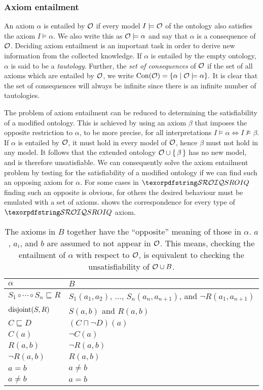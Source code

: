 \subsubsection{Axiom entailment} \label{axiom-entailment}

An axiom $\alpha$ is entailed by $\mathcal{O}$ if every model $I \models \mathcal{O}$ of the ontology also satisfies the axiom $I \models \alpha$. We also write this as $\mathcal{O} \models \alpha$ and say that $\alpha$ is a consequence of $\mathcal{O}$. Deciding axiom entailment is an important task in order to derive new information from the collected knowledge. If $\alpha$ is entailed by the empty ontology, $\alpha$ is said to be a \emph{tautology}. Further, the \emph{set of consequences} of $\mathcal{O}$ if the set of all axioms which are entailed by $\mathcal{O}$, we write $\operatorname{Con}(\mathcal{O}) = \{ \alpha \mid \mathcal{O} \models \alpha \}.$ It is clear that the set of consequences will always be infinite since there is an infinite number of tautologies.

The problem of axiom entailment can be reduced to determining the satisfiability of a modified ontology. This is achieved by using an axiom $\beta$ that imposes the opposite restriction to $\alpha$, to be more precise, for all interpretations $I \models \alpha \iff I \not\models \beta$. If $\alpha$ is entailed by $\mathcal{O}$, it must hold in every model of $\mathcal{O}$, hence $\beta$ must not hold in any model. It follows that the extended ontology $\mathcal{O} \cup \{ \, \beta \, \}$ has no new model, and is therefore unsatisfiable. We can consequently solve the axiom entailment problem by testing for the satisfiability of a modified ontology if we can find such an opposing axiom for $\alpha$. For some cases in $\SROIQ$ finding such an opposite is obvious, for others the desired behaviour must be emulated with a set of axioms.  shows the correspondence for every type of $\SROIQ$ axiom.
\begin{table}[ht]
  \centering
  \begin{tabular}{|l|l|}
    \hline
    $\alpha$ & $B$ \\
    \hline
    $S_1 \circ \cdots \circ S_n \sqsubseteq R$ & $S_1(a_1, a_2)$, $\dots$, $S_n(a_n, a_{n + 1})$, and $\lnot R(a_1, a_{n + 1})$ \\
    $\operatorname{disjoint}(S, R)$ & $S(a, b)$ and $R(a, b)$ \\
    $C \sqsubseteq D$ & $(C \sqcap \lnot D)(a)$ \\
    $C(a)$ & $\lnot C(a)$ \\
    $R(a, b)$ & $\lnot R(a, b)$ \\
    $\lnot R(a, b)$ & $R(a, b)$ \\
    $a = b$ & $a \not= b$ \\
    $a \not= b$ & $a = b$ \\
    \hline
  \end{tabular}
  \label{tab:entailment-reduction}
  \caption[Axioms substitution for reducing entailment to satisfiability]{The axioms in $B$ together have the “opposite” meaning of those in $\alpha$. $a$, $a_i$, and $b$ are assumed to not appear in $\mathcal{O}$. This means, checking the entailment of $\alpha$ with respect to $\mathcal{O}$, is equivalent to checking the unsatisfiability of $\mathcal{O} \cup B$.}
\end{table}

